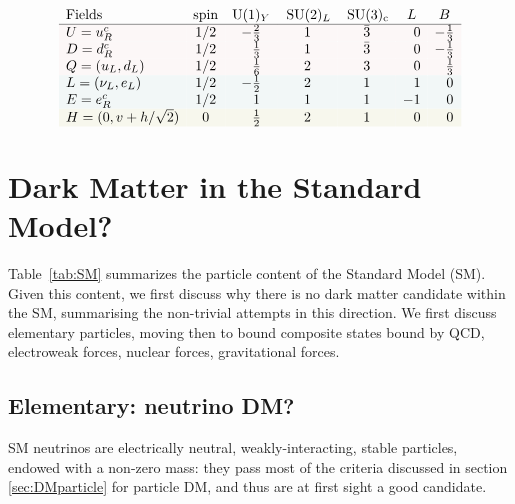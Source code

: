 \begin{table}[t]
$$\begin{array}{lcccccc}
\hbox{Fields}&{\rm spin} &{\rm U}(1)_Y&\SU(2)_L&\SU(3)_{\rm c}&L&B\cr \hline \rowcolor[rgb]{0.99,0.97,0.97}
U = u_R^c &1/2& -{2 \over 3} & 1 & \bar{3} &\phantom{-}0&-\frac13\cr \rowcolor[rgb]{0.99,0.97,0.97}
D = d_R^c &1/2& \phantom{-}{1 \over 3}& 1 &\bar{3} &\phantom{-}0&-\frac13\cr \rowcolor[rgb]{0.99,0.97,0.97}
Q=(u_L, d_L) &1/2 &\phantom{-} {1\over 6}  & 2 & 3&\phantom{-}0&\phantom{-}\frac13\cr \rowcolor[rgb]{0.95,0.97,0.97}
L=(\nu_L, e_L) &1/2& -{1 \over 2} & 2 &1&\phantom{-}1&\phantom{-}0\cr\rowcolor[rgb]{0.95,0.97,0.97}
E = e_R^c &1/2&\phantom{-}1 & 1 &1  &-1&\phantom{-}0\cr \rowcolor[rgb]{0.97,0.97,0.93}
H = (0,v+h/\sqrt{2})& 0&\phantom{-}{1 \over 2} & 2 &1&\phantom{-}0&\phantom{-}0\cr 
\end{array}$$
\caption[Standard Model]{\em List of {\bfseries Standard Model} Weyl fermions (quarks and leptons) and scalars, their charges under gauge interactions, and the
 lepton and baryon number accidental symmetries.\label{tab:SM}}
\end{table}





\section{Dark Matter in the Standard Model?}
\label{SMDM}
Table~\ref{tab:SM} summarizes the particle content of the Standard Model (SM). Given this content, we 
first discuss why there is no dark matter candidate within the SM,
summarising the non-trivial attempts in this direction.
We first discuss elementary particles, moving then to bound composite states bound by
QCD, electroweak forces, nuclear forces, gravitational forces.

\subsection{Elementary: neutrino DM?}\label{neutrinoDM}
SM neutrinos are electrically neutral, weakly-interacting, stable particles, endowed with a non-zero mass: they pass most of the criteria discussed in section \ref{sec:DMparticle} for particle DM, and thus are at first sight a good candidate. 

